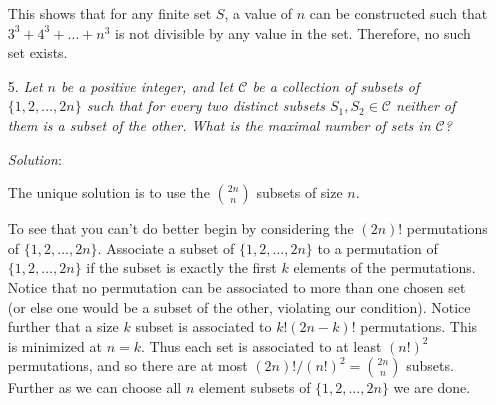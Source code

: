 \documentclass{article}
\begin{document}
\begin{enumerate}
This shows that for any finite set $S$, a value of $n$ can be constructed such that $3^3 + 4^3 + \dots + n^3$ is not divisible by any value in the set.
Therefore, no such set exists.


\item[5.] %
\textit{\newcommand{\CC}{\mathcal{C}}
Let $n$ be a positive integer, and let $\CC$ be a collection of subsets of $\{1, 2, \dotsc, 2n\}$ such that for every two distinct subsets $S_1, S_2 \in \CC$ neither of them is a subset of the other.
What is the maximal number of sets in $\CC$?}

\textit{Solution}:

The unique solution is to use the $\binom{2n}{n}$ subsets of size $n$.

To see that you can't do better begin by considering the $(2n)!$ permutations of $\{1, 2, \dotsc, 2n\}$.
Associate a subset of $\{1, 2, \dotsc, 2n\}$ to a permutation of $\{1, 2, \dotsc, 2n\}$ if the subset is exactly the first $k$ elements of the permutations.
Notice that no permutation can be associated to more than one chosen set (or else one would be a subset of the other, violating our condition).
Notice further that a size $k$ subset is associated to $k!(2n-k)!$ permutations.
This is minimized at $n=k$.
Thus each set is associated to at least $(n!)^2$ permutations, and so there are at most $(2n)! / (n!)^2 = \binom{2n}{n}$ subsets.
Further as we can choose all $n$ element subsets of $\{1, 2, \dotsc, 2n\}$ we are done. 
\end{enumerate}
\end{document}
